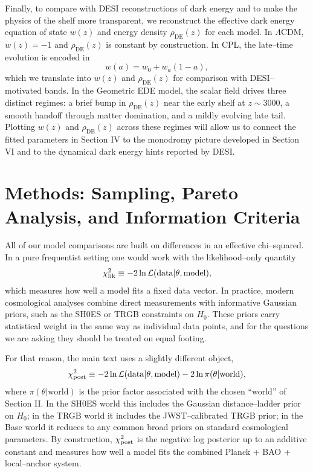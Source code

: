 \documentclass[a4paper,11pt]{article}
\begin{document}
Finally, to compare with DESI reconstructions of dark energy and to make the physics of the shelf more transparent, we reconstruct the effective dark energy equation of state $w(z)$ and energy density $\rho_{\mathrm{DE}}(z)$ for each model. In $\Lambda$CDM, $w(z) = -1$ and $\rho_{\mathrm{DE}}(z)$ is constant by construction. In CPL, the late--time evolution is encoded in
\begin{equation}
w(a) = w_0 + w_a (1 - a),
\end{equation}
which we translate into $w(z)$ and $\rho_{\mathrm{DE}}(z)$ for comparison with DESI--motivated bands. In the Geometric EDE model, the scalar field drives three distinct regimes: a brief bump in $\rho_{\mathrm{DE}}(z)$ near the early shelf at $z \sim 3000$, a smooth handoff through matter domination, and a mildly evolving late tail. Plotting $w(z)$ and $\rho_{\mathrm{DE}}(z)$ across these regimes will allow us to connect the fitted parameters in Section IV to the monodromy picture developed in Section VI and to the dynamical dark energy hints reported by DESI.


\section{Methods: Sampling, Pareto Analysis, and Information Criteria}

All of our model comparisons are built on differences in an effective chi--squared. In a pure frequentist setting one would work with the likelihood--only quantity
\begin{equation}
\chi^2_{\rm lik} \equiv -2 \ln \mathcal{L}(\mathrm{data}|\theta,\mathrm{model}),
\end{equation}
which measures how well a model fits a fixed data vector. In practice, modern cosmological analyses combine direct measurements with informative Gaussian priors, such as the SH0ES or TRGB constraints on $H_0$. These priors carry statistical weight in the same way as individual data points, and for the questions we are asking they should be treated on equal footing.

For that reason, the main text uses a slightly different object,
\begin{equation}
\chi^2_{\rm post} \equiv -2 \ln \mathcal{L}(\mathrm{data}|\theta,\mathrm{model}) - 2 \ln \pi(\theta|\mathrm{world}),
\end{equation}
where $\pi(\theta|\mathrm{world})$ is the prior factor associated with the chosen ``world'' of Section II. In the SH0ES world this includes the Gaussian distance--ladder prior on $H_0$; in the TRGB world it includes the JWST--calibrated TRGB prior; in the Base world it reduces to any common broad priors on standard cosmological parameters. By construction, $\chi^2_{\rm post}$ is the negative log posterior up to an additive constant and measures how well a model fits the combined Planck + BAO + local--anchor system.
\end{document}
